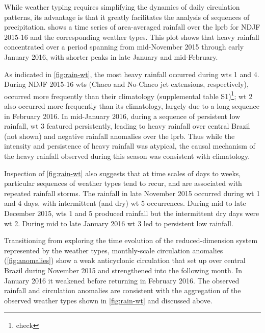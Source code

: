 \documentclass[twocol]{ametsoc}
\begin{document}
While weather typing requires simplifying the dynamics of daily circulation patterns, its advantage is that it greatly facilitates the analysis of sequences of precipitation.
 shows a time series of area-averaged rainfall over the \gls{lprb} for NDJF 2015-16 and the corresponding weather types.
This plot shows that heavy rainfall concentrated over a period spanning from mid-November 2015 through early January 2016, with shorter peaks in late January and mid-February.

As indicated in \cref{fig:rain-wt}, the most heavy rainfall occurred during \glspl{wt} 1 and 4.
During NDJF 2015-16 \glspl{wt} (Chaco and No-Chaco jet extensions, respectively),  occurred more frequently than their climatology (supplemental table S1)\footnote{check}; \gls{wt} 2 also occurred more frequently than its climatology, largely due to a long sequence in February 2016.
In mid-January 2016, during a sequence of persistent low rainfall, \gls{wt} 3 featured persistently, leading to heavy rainfall over central Brazil (not shown) and negative rainfall anomalies over the \gls{lprb}.
Thus while the intensity and persistence of heavy rainfall was atypical, the causal mechanism of the heavy rainfall observed during this season was consistent with climatology.

Inspection of \cref{fig:rain-wt} also suggests that at time scales of days to weeks, particular sequences of weather types tend to recur, and are associated with repeated rainfall storms.
The rainfall in late November 2015 occurred during \gls{wt} 1 and 4 days, with intermittent (and dry) \gls{wt} 5 occurrences.
During mid to late December 2015, \glspl{wt} 1 and 5 produced rainfall but the intermittent dry days were \gls{wt} 2.
During mid to late January 2016 \gls{wt} 3 led to persistent low rainfall.

Transitioning from exploring the time evolution of the reduced-dimension system represented by the weather types, monthly-scale circulation anomalies (\cref{fig:anomalies}) show a weak anticyclonic circulation that set up over central Brazil during November 2015 and strengthened into the following month.
In January 2016 it weakened before returning in February 2016.
The observed rainfall and circulation anomalies are consistent with the aggregation of the observed weather types shown in \cref{fig:rain-wt} and discussed above.

\end{document}
